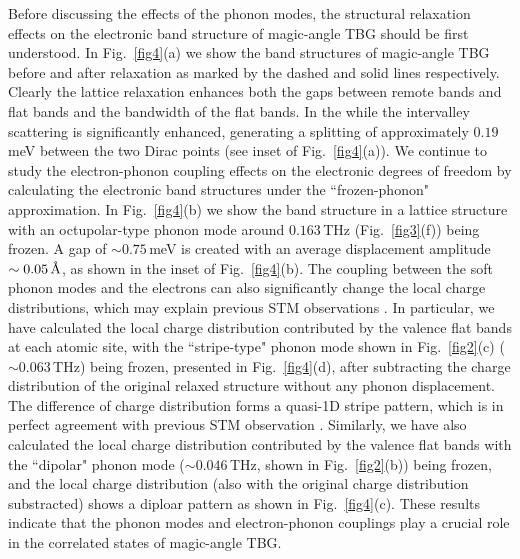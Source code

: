 \documentclass[aps,prl,twocolumn,amsmath,amssymb]{revtex4-2}
\def\angstrom{\mbox{\normalfont\AA}}
\begin{document}
Before discussing the effects of the phonon modes, the structural relaxation effects on the electronic band structure of magic-angle TBG should be first understood. In Fig.~\ref{fig4}(a) we show the band structures of magic-angle TBG before and after relaxation as marked by the dashed and solid lines respectively. Clearly the lattice relaxation enhances both the gaps between remote bands and flat bands and the bandwidth of the flat bands. In the while the intervalley scattering is significantly enhanced, generating a splitting of approximately $0.19\,$meV between the two Dirac points (see inset of Fig.~\ref{fig4}(a)). 
We continue to study the electron-phonon coupling effects on the electronic degrees of freedom by calculating the electronic band structures under the ``frozen-phonon" approximation. 
In Fig.~\ref{fig4}(b) we show the band structure in a lattice structure with an octupolar-type phonon mode around $0.163\,$THz (Fig.~\ref{fig3}(f)) being frozen. A gap of $\sim 0.75\,$meV is created with an average displacement amplitude  $\sim0.05\,\angstrom$, as shown in the inset of Fig.~\ref{fig4}(b).  The coupling between the soft phonon modes and the electrons can also significantly change the local charge distributions, which may explain previous STM observations \cite{tbg-stm-andrei19}. In particular, we have calculated the local charge distribution contributed by the valence flat bands at each atomic site, with the ``stripe-type" phonon mode shown in Fig.~\ref{fig2}(c) ($\sim$0.063\,THz) being frozen, presented in Fig.~\ref{fig4}(d), after subtracting the charge distribution of the original relaxed structure without any phonon displacement. The difference of charge distribution forms a quasi-1D stripe pattern, which is in perfect agreement with previous STM observation \cite{tbg-stm-andrei19}. Similarly, we have also calculated the local charge distribution contributed by the valence flat bands with the ``dipolar" phonon mode ($\sim\!0.046\,$THz, shown in Fig.~\ref{fig2}(b)) being frozen, and the local charge distribution (also with the original charge distribution substracted) shows a diploar pattern as shown in Fig.~\ref{fig4}(c).  These results indicate that the phonon modes and electron-phonon couplings play a crucial role in the correlated states of magic-angle TBG. 
\end{document}

